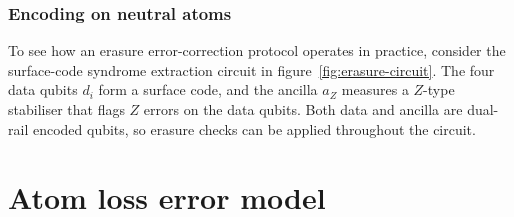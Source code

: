 \documentclass{article}
\begin{document}

    \subsubsection{Encoding on neutral atoms}
    To see how an erasure error-correction protocol operates in practice, consider the surface-code syndrome extraction circuit in figure~\ref{fig:erasure-circuit}.  
    The four data qubits $d_i$ form a surface code, and the ancilla $a_Z$ measures a $Z$-type stabiliser that flags $Z$ errors on the data qubits.  
    Both data and ancilla are dual-rail encoded qubits, so erasure checks can be applied throughout the circuit.  \\

\section{Atom loss error model}

\end{document}
